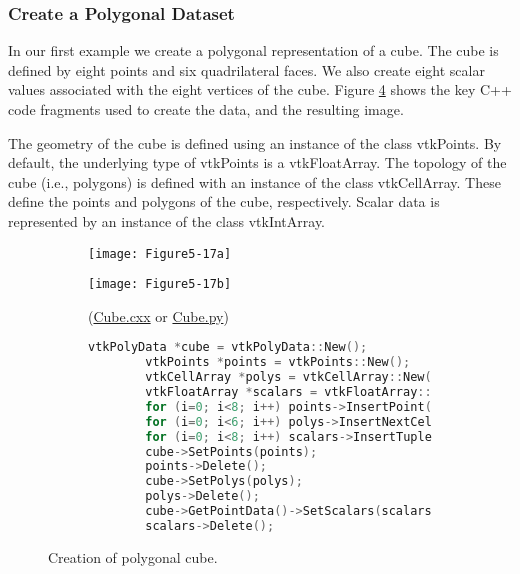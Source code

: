 \subsubsection{Create a Polygonal Dataset}

In our first example we create a polygonal representation of a cube. The cube is defined by eight points and six quadrilateral faces. We also create eight scalar values associated with the eight vertices of the cube. Figure \ref{fig:Figure5-17} shows the key C++ code fragments used to create the data, and the resulting image.

The geometry of the cube is defined using an instance of the class vtkPoints. By default, the underlying type of vtkPoints is a vtkFloatArray. The topology of the cube (i.e., polygons) is defined with an instance of the class vtkCellArray. These define the points and polygons of the cube, respectively. Scalar data is represented by an instance of the class vtkIntArray.

\begin{figure}[!htb]
	\begin{subfigure}[h]{0.48\linewidth}
		\texttt{[image: Figure5-17a]}
		\caption*{}
		\label{fig:Figure5-17a}
	\end{subfigure}
	\hfill
	\begin{subfigure}[h]{0.48\linewidth}
		\texttt{[image: Figure5-17b]}
		\caption*{(\href{https://lorensen.github.io/VTKExamples/site/Cxx/GeometricObjects/Cube/}{Cube.cxx} or \href{https://lorensen.github.io/VTKExamples/site/Python/GeometricObjects/Cube/}{Cube.py})}
		\label{fig:Figure5-17b}
	\end{subfigure}
	\hfill
	\begin{subfigure}[h]{0.96\linewidth}
		\caption*{}
	\end{subfigure}
	\hfill
	\begin{subfigure}[h]{0.96\linewidth}
		\begin{lstlisting}[language=C++, caption={}]
		vtkPolyData *cube = vtkPolyData::New();
		vtkPoints *points = vtkPoints::New();
		vtkCellArray *polys = vtkCellArray::New();
		vtkFloatArray *scalars = vtkFloatArray::New();
		for (i=0; i<8; i++) points->InsertPoint(i,x[i]);
		for (i=0; i<6; i++) polys->InsertNextCell(4,pts[i]);
		for (i=0; i<8; i++) scalars->InsertTuple1(i,i);
		cube->SetPoints(points);
		points->Delete();
		cube->SetPolys(polys);
		polys->Delete();
		cube->GetPointData()->SetScalars(scalars);
		scalars->Delete();
		\end{lstlisting}
		\caption*{}
		\label{fig:Figure5-17c}
	\end{subfigure}
	\caption{Creation of polygonal cube.}\label{fig:Figure5-17}
\end{figure}

